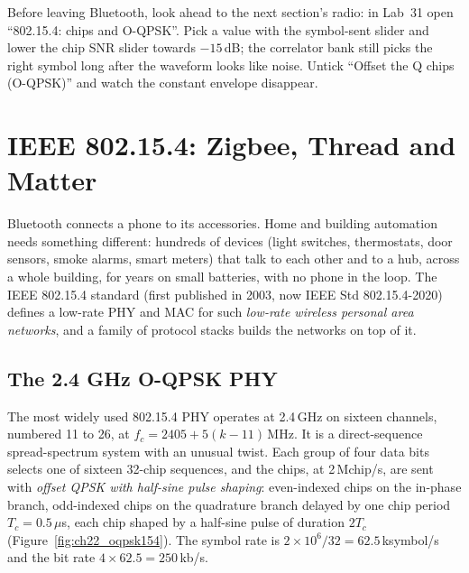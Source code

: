 \begin{tryit}
Before leaving Bluetooth, look ahead to the next section's radio: in Lab~31 open ``802.15.4: chips and
O-QPSK''. Pick a value with the symbol-sent slider and lower the chip SNR slider towards $-15$\,dB;
the correlator bank still picks the right symbol long after the waveform looks like noise. Untick
``Offset the Q chips (O-QPSK)'' and watch the constant envelope disappear.
\end{tryit}

\section{IEEE 802.15.4: Zigbee, Thread and Matter}
\label{sec:ch22:154}

Bluetooth connects a phone to its accessories. Home and building automation needs something
different: hundreds of devices (light switches, thermostats, door sensors, smoke alarms, smart
meters) that talk to each other and to a hub, across a whole building, for years on small batteries,
with no phone in the loop. The IEEE 802.15.4 standard (first published in 2003, now IEEE Std
802.15.4-2020) defines a low-rate PHY and MAC for such \emph{low-rate wireless personal area
networks}, and a family of protocol stacks builds the networks on top of it.


\subsection{The 2.4 GHz O-QPSK PHY}

The most widely used 802.15.4 PHY operates at 2.4\,GHz on sixteen channels, numbered 11 to 26, at
$f_c=2405+5(k-11)$\,MHz. It is a direct-sequence spread-spectrum system with an unusual twist. Each
group of four data bits selects one of sixteen 32-chip sequences, and the chips, at 2\,Mchip/s, are
sent with \emph{offset QPSK with half-sine pulse shaping}: even-indexed chips on the in-phase branch,
odd-indexed chips on the quadrature branch delayed by one chip period $T_c=0.5\,\mu$s, each chip
shaped by a half-sine pulse of duration $2T_c$ (Figure~\ref{fig:ch22_oqpsk154}). The symbol rate is
$2\times10^6/32=62.5$\,ksymbol/s and the bit rate $4\times62.5=250$\,kb/s.


